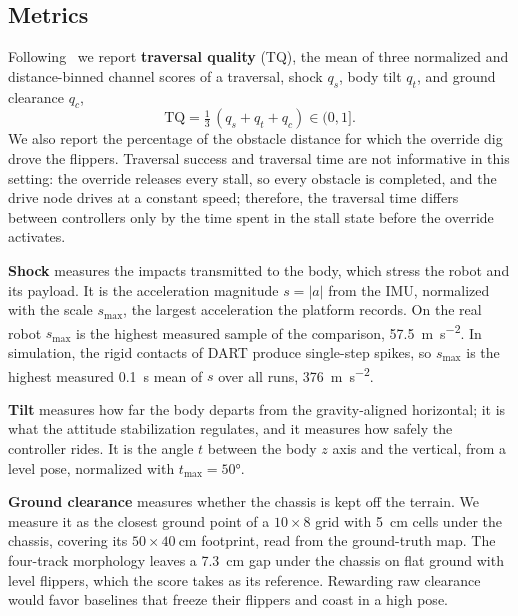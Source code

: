\subsection{Metrics}
Following~\cite{cihala2025} we report \textbf{traversal quality} (TQ), the mean of three
normalized and distance-binned channel scores of a traversal, shock $q_s$, body tilt
$q_t$, and ground clearance $q_c$,
\begin{equation}
  \mathrm{TQ}=\tfrac{1}{3}\,(q_s+q_t+q_c)\in(0,1].
  \label{eq:tq}
\end{equation}
We also report the percentage of the obstacle distance for which the \SAS{} override dig drove the flippers.
Traversal success and traversal time are not informative in this setting: the override
releases every stall, so every obstacle is completed, and the drive node drives at a constant speed; therefore, the traversal time differs between controllers only by the time spent in the stall state before the override activates.
\label{sec:metrics-block}%

\noindent\textbf{Shock} measures the impacts transmitted to the body, which stress
the robot and its payload. It is the acceleration magnitude $s=|a|$ from the IMU, normalized with the scale $s_{\max}$, the
largest acceleration the platform records. On the real robot $s_{\max}$ is the highest measured
sample of the comparison, \SI{57.5}{\metre\per\second\squared}. In simulation, the rigid contacts of DART produce single-step spikes, so $s_{\max}$ is the highest measured \SI{0.1}{\second} mean of
$s$ over all runs, \SI{376}{\metre\per\second\squared}.

\noindent\textbf{Tilt} measures how far the body departs from the gravity-aligned
horizontal; it is what the attitude stabilization regulates, and it measures how safely the controller rides. It is the angle
$t$ between the body $z$ axis and the vertical, from a level pose, normalized with
$t_{\max}=\ang{50}$.

\noindent\textbf{Ground clearance} measures whether the chassis is kept off the terrain. We measure it as the
closest ground point of a $10\times8$ grid with \SI{5}{\centi\metre}
cells under the chassis, covering its $50\times\SI{40}{\centi\metre}$ footprint, read from the ground-truth map. The four-track morphology leaves a \SI{7.3}{\centi\metre} gap under the chassis on flat
ground with level flippers, which the score takes as its reference. Rewarding raw clearance would favor
baselines that freeze their flippers and coast in a high pose.


